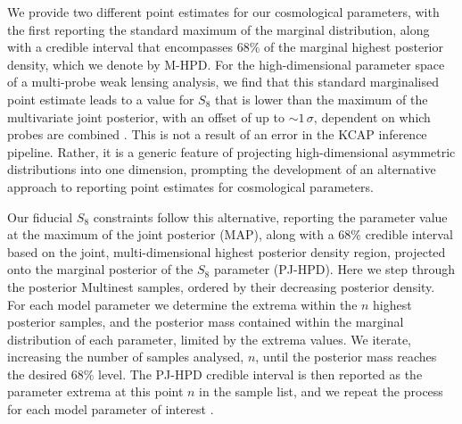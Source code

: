 We provide two different point estimates for our cosmological parameters, with the first reporting the standard maximum of the marginal distribution, 
along with a credible interval that encompasses 68\% of the marginal highest posterior density, which we denote by M-HPD.  
For the high-dimensional parameter space of a multi-probe weak lensing analysis, we find that this standard marginalised point estimate leads to a value for $S_8$ that is lower than the 
maximum of the multivariate joint posterior, with an offset of up to $\sim\!1\,\sigma$, dependent on which probes are combined \citep[see section 7 of][]{joachimi/etal:inprep}.
This is not a result of an error in the {\sc KCAP} inference pipeline. 
Rather, it is a generic feature of projecting high-dimensional asymmetric distributions into one dimension, prompting the development of an alternative approach to reporting point estimates for cosmological parameters.

Our fiducial $S_8$ constraints follow this alternative, reporting the parameter value at the maximum of the joint posterior (MAP), along with a 68\% credible interval based on the joint, multi-dimensional highest posterior density region, projected onto the marginal posterior of the $S_8$ parameter (PJ-HPD).   
Here we step through the posterior {\sc Multinest} samples, ordered by their decreasing posterior density.  
For each model parameter we determine the extrema within the $n$ highest posterior samples, and the posterior mass contained within the marginal distribution of each parameter, limited by the extrema values.   
We iterate, increasing the number of samples analysed, $n$, until the posterior mass reaches the desired 68\% level.   
The PJ-HPD credible interval is then reported as the parameter extrema at this point $n$ in the sample list, and we repeat the process for each model parameter of interest \citep[see section 6.4 of][for further details]{joachimi/etal:inprep}.   


